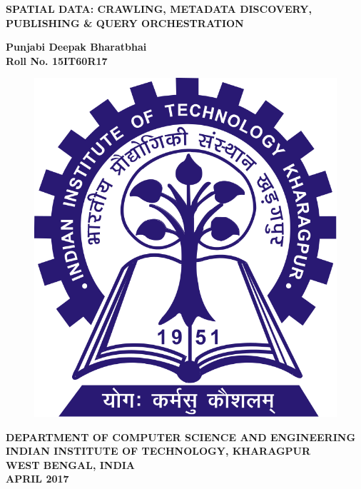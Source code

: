 \thispagestyle{empty}
\vspace{1cm}

\begin{center}
	\textbf { \LARGE SPATIAL DATA: CRAWLING, METADATA DISCOVERY, PUBLISHING \& QUERY ORCHESTRATION}
	\vspace{1.7in}

	{\bf Punjabi Deepak Bharatbhai }\\
	{\bf Roll No. 15IT60R17}\\
	  \vspace{1.2 in}
	  \begin{figure}[h]
	    \centering
	        \includegraphics[scale=0.15]{images/logo.png}
	    \end{figure}
	 \begin{center}
	    {{\bf DEPARTMENT OF COMPUTER SCIENCE AND ENGINEERING } \\
	        {\bf INDIAN INSTITUTE OF TECHNOLOGY, KHARAGPUR}\\
	        {\bf WEST BENGAL, INDIA}\\ 
		 {\bf APRIL 2017}
	    }
	  \end{center}
\end{center}
